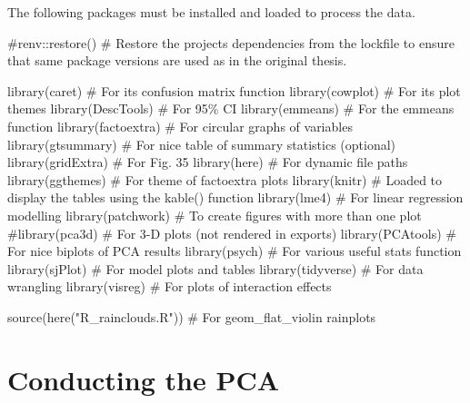 \documentclass[
  letterpaper,
  DIV=11,
  numbers=noendperiod]{scrreprt}
\newenvironment{Shaded}{\begin{snugshade}}{\end{snugshade}}
\newcommand{\CommentTok}[1]{\textcolor[rgb]{0.37,0.37,0.37}{#1}}
\newcommand{\FunctionTok}[1]{\textcolor[rgb]{0.28,0.35,0.67}{#1}}
\newcommand{\NormalTok}[1]{\textcolor[rgb]{0.00,0.23,0.31}{#1}}
\newcommand{\StringTok}[1]{\textcolor[rgb]{0.13,0.47,0.30}{#1}}
\begin{document}
The following packages must be installed and loaded to process the data.

\begin{Shaded}
\begin{Highlighting}[]
\CommentTok{\#renv::restore() \# Restore the project\textquotesingle{}s dependencies from the lockfile to ensure that same package versions are used as in the original thesis.}

\FunctionTok{library}\NormalTok{(caret) }\CommentTok{\# For its confusion matrix function}
\FunctionTok{library}\NormalTok{(cowplot) }\CommentTok{\# For its plot themes}
\FunctionTok{library}\NormalTok{(DescTools) }\CommentTok{\# For 95\% CI}
\FunctionTok{library}\NormalTok{(emmeans) }\CommentTok{\# For the emmeans function}
\FunctionTok{library}\NormalTok{(factoextra) }\CommentTok{\# For circular graphs of variables}
\FunctionTok{library}\NormalTok{(gtsummary) }\CommentTok{\# For nice table of summary statistics (optional)}
\FunctionTok{library}\NormalTok{(gridExtra) }\CommentTok{\# For Fig. 35}
\FunctionTok{library}\NormalTok{(here) }\CommentTok{\# For dynamic file paths}
\FunctionTok{library}\NormalTok{(ggthemes) }\CommentTok{\# For theme of factoextra plots}
\FunctionTok{library}\NormalTok{(knitr) }\CommentTok{\# Loaded to display the tables using the kable() function}
\FunctionTok{library}\NormalTok{(lme4) }\CommentTok{\# For linear regression modelling}
\FunctionTok{library}\NormalTok{(patchwork) }\CommentTok{\# To create figures with more than one plot}
\CommentTok{\#library(pca3d) \# For 3{-}D plots (not rendered in exports)}
\FunctionTok{library}\NormalTok{(PCAtools) }\CommentTok{\# For nice biplots of PCA results}
\FunctionTok{library}\NormalTok{(psych) }\CommentTok{\# For various useful stats function}
\FunctionTok{library}\NormalTok{(sjPlot) }\CommentTok{\# For model plots and tables}
\FunctionTok{library}\NormalTok{(tidyverse) }\CommentTok{\# For data wrangling}
\FunctionTok{library}\NormalTok{(visreg) }\CommentTok{\# For plots of interaction effects}

\FunctionTok{source}\NormalTok{(}\FunctionTok{here}\NormalTok{(}\StringTok{"R\_rainclouds.R"}\NormalTok{)) }\CommentTok{\# For geom\_flat\_violin rainplots}
\end{Highlighting}
\end{Shaded}

\section{Conducting the PCA}\label{conducting-the-pca}
\end{document}
